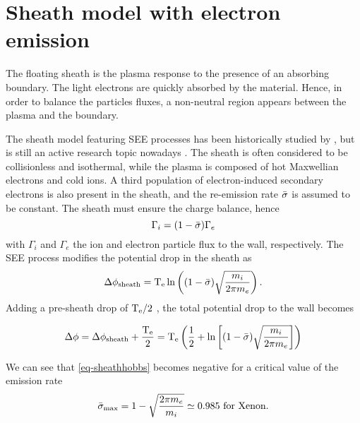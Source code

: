 
\section{Sheath model with electron emission}
  \label{sec-sheath}
    
  The floating sheath is the plasma response to the presence of an absorbing boundary.
  The light electrons are quickly absorbed by the material.
  Hence, in order to balance the particles fluxes, a non-neutral region appears between the plasma and the boundary.
  
  
  The sheath model featuring SEE processes has been historically studied by \citet{hobbs1967}, but is still an active research topic nowadays \citep{ahedo2005}.
  The sheath is often considered to be collisionless and isothermal, while the plasma is composed of hot Maxwellian electrons and cold ions. A third population of electron-induced secondary electrons is also present in the sheath, and the re-emission rate $ \bar{\sigma }$ is assumed to be constant.
  The sheath must ensure the charge balance, hence
  \begin{equation} \label{eq-sheath_SEE}
    \Gamma_i = ( 1 -  \bar{\sigma }) \Gamma_e
  \end{equation}
  with $\Gamma_i$ and $\Gamma_e$ the ion and electron particle flux to the wall, respectively.
  The SEE process modifies the potential drop in the sheath as \citep{hobbs1967}
  \begin{equation} \label{eq-sheathhobbs}
    \Delta \phi_{\rm sheath} = \mathrm{T_e} \ln \left( (1 -  \bar{\sigma }) \sqrt{\frac{m_i}{2 \pi m_e}}   \right).
  \end{equation}
  Adding a pre-sheath drop of $\mathrm{T_e}/2$ \citep{ahedo2002}, the total potential drop to the wall becomes
  
  \begin{equation} \label{eq-total_drop}
    \Delta \phi = \Delta \phi_{\rm sheath} + \frac{\mathrm{T_e}}{2} =  \mathrm{T_e} \left( \frac{1}{2} + \ln \left[ (1 -  \bar{\sigma }) \sqrt{\frac{m_i}{2 \pi m_e}}   \right]  \right)
  \end{equation}
  
  We can see that \cref{eq-sheathhobbs} becomes negative for a critical value of the emission rate
  \begin{equation} \label{eq-ratecrone}
     \bar{\sigma }_{\rm max} = 1 - \sqrt{\frac{2 \pi m_e}{m_i}} \simeq 0.985 \text{ for Xenon.}
  \end{equation}
  
